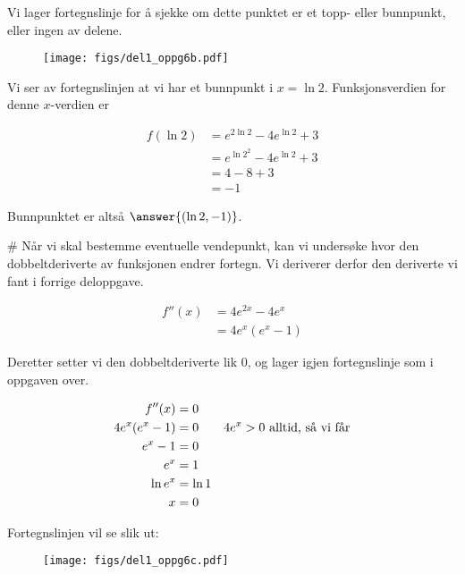 \begin{easylist}[enumerate]
	Vi lager fortegnslinje for å sjekke om dette punktet er et topp- eller bunnpunkt, eller ingen av delene.
	
	\begin{figure}[ht!]
		\centering
		\texttt{[image: figs/del1\_oppg6b.pdf]}
		\label{fig:del1_oppg6b}
	\end{figure}
	
	Vi ser av fortegnslinjen at vi har et bunnpunkt i $x = \ln 2$. Funksjonsverdien for denne $x$-verdien er
	
	\begin{equation*}
		\begin{aligned}
		f(\ln 2) & = e^{2\ln2} - 4e^{\ln 2} + 3\\
		& = e^{\ln 2^2} - 4e^{\ln 2} + 3 \\
		& = 4 - 8 + 3 \\
		& = -1
		\end{aligned}
	\end{equation*}
	
	Bunnpunktet er altså $\answer{(\ln 2, -1)}$.
	
	
	# Når vi skal bestemme eventuelle vendepunkt, kan vi undersøke hvor den dobbeltderiverte av funksjonen endrer fortegn. Vi deriverer derfor den deriverte vi fant i forrige deloppgave. 
	
	\begin{equation*}
		\begin{aligned}
		f''(x) & = 4e^{2x} - 4e^x \\
		& = 4e^x(e^x -1)
		\end{aligned}
	\end{equation*}
	
	Deretter setter vi den dobbeltderiverte lik $0$, og lager igjen fortegnslinje som i oppgaven over.
	
	\begin{equation*}
		\begin{aligned}
		f''(x) & = 0 \\
		4e^x(e^x-1) & = 0 \qquad \textnormal{$4e^x > 0$ alltid, så vi får}\\ 
		e^x -1 & = 0 \\
		e^x & = 1 \\
		\ln e^x & = \ln 1 \\
		x & = 0
		\end{aligned}
	\end{equation*}
	
	Fortegnslinjen vil se slik ut:
	
	\begin{figure}[ht!]
		\centering
		\texttt{[image: figs/del1\_oppg6c.pdf]}
		\label{fig:del1_oppg6c}
	\end{figure}
	

\end{easylist}
